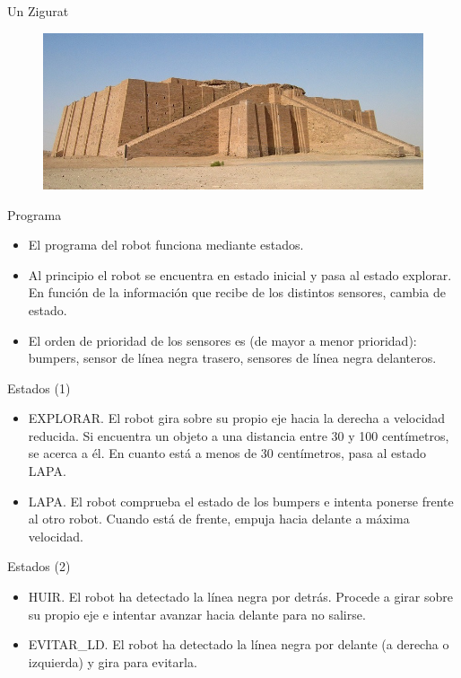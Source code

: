 \documentclass[spanish]{beamer}
\begin{document}
\begin{frame}{Un Zigurat}
  \begin{figure}
    \includegraphics[scale=0.5]{./img/zigurat-mesopotamico}
    \end{figure}
\end{frame}

\begin{frame}{Programa}
  \begin{itemize}
    \item El programa del robot funciona mediante estados.
    \item Al principio el robot se encuentra en estado inicial y pasa al estado explorar. En función de la información que recibe de los distintos sensores, cambia de estado.
    \item El orden de prioridad de los sensores es (de mayor a menor prioridad): bumpers, sensor de línea negra trasero, sensores de línea negra delanteros. 
  \end{itemize}
\end{frame}

\begin{frame}{Estados (1)}
  \begin{itemize}
    \item EXPLORAR. El robot gira sobre su propio eje hacia la derecha a velocidad reducida. Si encuentra un objeto a una distancia entre 30 y 100 centímetros, se acerca a él. En cuanto está a menos de 30 centímetros, pasa al estado LAPA.
    \item LAPA. El robot comprueba el estado de los bumpers e intenta ponerse frente al otro robot. Cuando está de frente, empuja hacia delante a máxima velocidad.
  \end{itemize}
\end{frame}

\begin{frame}{Estados (2)}
  \begin{itemize}
    \item HUIR. El robot ha detectado la línea negra por detrás. Procede a girar sobre su propio eje e intentar avanzar hacia delante para no salirse.
    \item EVITAR\_LD. El robot ha detectado la línea negra por delante (a derecha o izquierda) y gira para evitarla.
  \end{itemize}
\end{frame}
\end{document}
